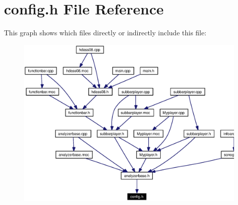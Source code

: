 \section{config.h File Reference}
\label{config_8h}




This graph shows which files directly or indirectly include this file:\begin{figure}[H]
\begin{center}
\leavevmode
\includegraphics[width=365pt]{config_8h__dep__incl}
\end{center}
\end{figure}
